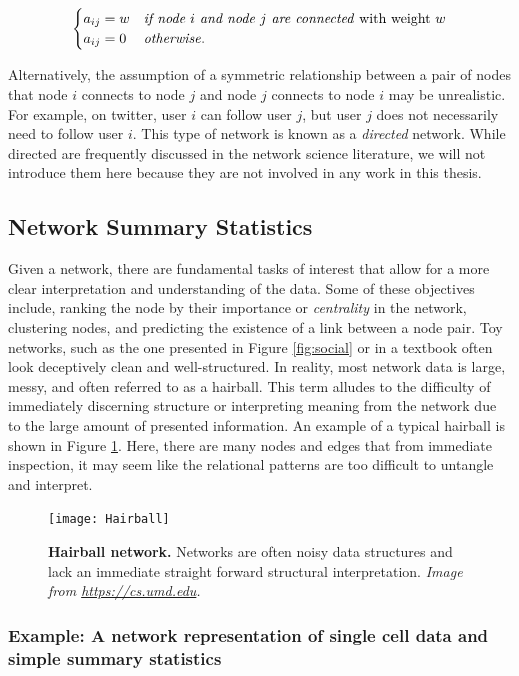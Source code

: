 \[ \begin{cases} 
     a_{ij}=w & \text{\emph{if node $i$ and node $j$ are connected} with weight $w$} \\
      a_{ij}=0 & \text{\emph{otherwise}}.
         \end{cases}
\]

Alternatively, the assumption of a symmetric relationship between a pair of nodes that node $i$ connects to node $j$ and node $j$ connects to node $i$  may be unrealistic. For example, on twitter, user $i$ can follow user $j$, but user $j$ does not necessarily need to follow user $i$. This type of network is known as a \emph{directed} network. While directed are frequently discussed in the network science literature, we will not introduce them here because they are not involved in any work in this thesis. 

\subsection{Network Summary Statistics}

\indent Given a network, there are fundamental tasks of interest that allow for a more clear interpretation and understanding of the data. Some of these objectives include, ranking the node by their importance or \emph{centrality} in the network, clustering nodes, and predicting the existence of a link between a node pair. Toy networks, such as the one presented in Figure \ref{fig:social} or in a textbook often look deceptively clean and well-structured. In reality, most network data is large, messy, and often referred to as a hairball. This term alludes to the difficulty of immediately discerning structure or interpreting meaning from the network due to the large amount of presented information. An example of a typical hairball is shown in Figure \ref{fig:Hairball}. Here, there are many nodes and edges that from immediate inspection, it may seem like the relational patterns are too difficult to untangle and interpret.

\begin{figure}
\begin{center}
\texttt{[image: Hairball]}
\caption{{\bf Hairball network.} Networks are often noisy data structures and lack an immediate straight forward structural interpretation. \emph{Image from \url{https://cs.umd.edu}.}}
\label{fig:Hairball}
\end{center}
\end{figure}

\subsubsection{Example: A network representation of single cell data and simple summary statistics}

